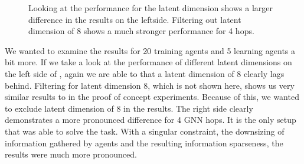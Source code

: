 \begin{figure}[htp]
    \centering
    \hspace{1cm}                       
    \caption{Looking at the performance for the latent dimension shows a larger difference in the results on the leftside. Filtering out latent dimension of 8 shows a much stronger performance for 4 hops.}
    \label{fig:ablation-ld-no-ld8}
\end{figure}

We wanted to examine the results for 20 training agents and 5 learning agents a bit more. If we take a look at the performance of different latent dimensions on the left side of , again we are able to that a latent dimension of 8 clearly lags behind. Filtering for latent dimension 8, which is not shown here, shows us very similar results to  in the proof of concept experiments. Because of this, we wanted to exclude latent dimension of 8 in the results. The right side clearly demonstrates a more pronounced difference for 4 GNN hops. It is the only setup that was able to solve the task. With a singular constraint, the downsizing of information gathered by agents and the resulting information sparseness, the results were much more pronounced.



